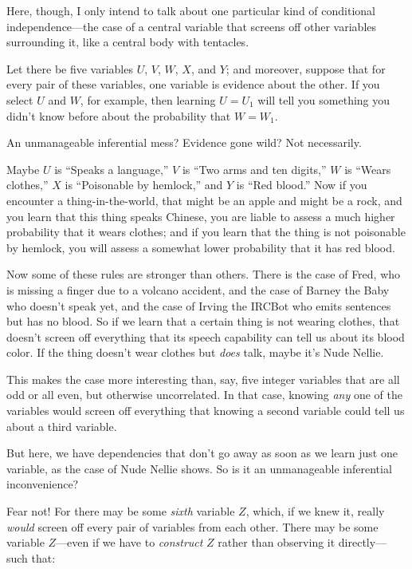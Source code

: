 { Here, though, I only intend to talk about one particular kind of
conditional independence---the case of a central variable that screens
off other variables surrounding it, like a central body with
tentacles.


 Let there be five variables $U$, $V$, $W$, $X$, and $Y$; and moreover,
suppose that for every pair of these variables, one variable is
evidence about the other. If you select $U$ and $W$, for example, then
learning $U = U_{1}$ will tell you something you
didn't know before about the probability that $W =
W_{1}$.


 An unmanageable inferential mess? Evidence gone wild? Not
necessarily.


 Maybe $U$ is ``Speaks a
language,'' $V$ is ``Two arms and ten
digits,'' $W$ is ``Wears
clothes,'' $X$ is ``Poisonable by
hemlock,'' and $Y$ is ``Red
blood.'' Now if you encounter a thing-in-the-world,
that might be an apple and might be a rock, and you learn that this
thing speaks Chinese, you are liable to assess a much higher
probability that it wears clothes; and if you learn that the thing is
not poisonable by hemlock, you will assess a somewhat lower probability
that it has red blood.


 Now some of these rules are stronger than others. There is the
case of Fred, who is missing a finger due to a volcano accident, and
the case of Barney the Baby who doesn't speak yet, and
the case of Irving the IRCBot who emits sentences but has no blood. So
if we learn that a certain thing is not wearing clothes, that
doesn't screen off everything that its speech
capability can tell us about its blood color. If the thing
doesn't wear clothes but \textit{does} talk, maybe
it's Nude Nellie.


 This makes the case more interesting than, say, five integer
variables that are all odd or all even, but otherwise uncorrelated. In
that case, knowing \textit{any} one of the variables would screen off
everything that knowing a second variable could tell us about a third
variable.


 But here, we have dependencies that don't go away
as soon as we learn just one variable, as the case of Nude Nellie
shows. So is it an unmanageable inferential inconvenience?


 Fear not! For there may be some \textit{sixth} variable $Z$, which,
if we knew it, really \textit{would} screen off every pair of variables
from each other. There may be some variable $Z$---even if we have to
\textit{construct} $Z$ rather than observing it directly---such that:

}
